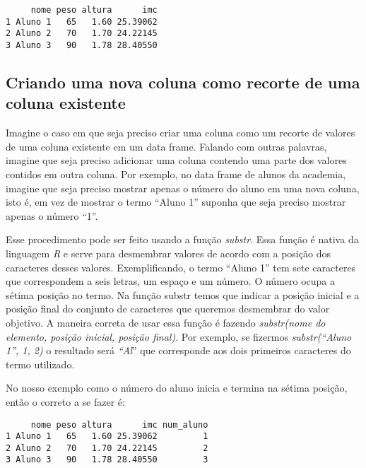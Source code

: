 \documentclass[
  letterpaper,
  DIV=11,
  numbers=noendperiod]{scrreprt}
\newenvironment{Shaded}{\begin{snugshade}}{\end{snugshade}}
\newcommand{\DecValTok}[1]{\textcolor[rgb]{0.68,0.00,0.00}{#1}}
\newcommand{\FunctionTok}[1]{\textcolor[rgb]{0.28,0.35,0.67}{#1}}
\newcommand{\NormalTok}[1]{\textcolor[rgb]{0.00,0.23,0.31}{#1}}
\newcommand{\OtherTok}[1]{\textcolor[rgb]{0.00,0.23,0.31}{#1}}
\newcommand{\SpecialCharTok}[1]{\textcolor[rgb]{0.37,0.37,0.37}{#1}}
\begin{document}
\begin{verbatim}
     nome peso altura      imc
1 Aluno 1   65   1.60 25.39062
2 Aluno 2   70   1.70 24.22145
3 Aluno 3   90   1.78 28.40550
\end{verbatim}

\subsection{Criando uma nova coluna como recorte de uma coluna
existente}\label{criando-uma-nova-coluna-como-recorte-de-uma-coluna-existente}

Imagine o caso em que seja preciso criar uma coluna como um recorte de
valores de uma coluna existente em um data frame. Falando com outras
palavras, imagine que seja preciso adicionar uma coluna contendo uma
parte dos valores contidos em outra coluna. Por exemplo, no data frame
de alunos da academia, imagine que seja preciso mostrar apenas o número
do aluno em uma nova coluna, isto é, em vez de mostrar o termo ``Aluno
1'' suponha que seja preciso mostrar apenas o número ``1''.

Esse procedimento pode ser feito usando a função \emph{substr}. Essa
função é nativa da linguagem \emph{R} e serve para desmembrar valores de
acordo com a posição dos caracteres desses valores. Exemplificando, o
termo ``Aluno 1'' tem sete caracteres que correspondem a seis letras, um
espaço e um número. O número ocupa a sétima posição no termo. Na função
substr temos que indicar a posição inicial e a posição final do conjunto
de caracteres que queremos desmembrar do valor objetivo. A maneira
correta de usar essa função é fazendo \emph{substr(nome do elemento,
posição inicial, posição final)}. Por exemplo, se fizermos
\emph{substr(``Aluno 1'', 1, 2)} o resultado será \emph{``Al}'' que
corresponde aos dois primeiros caracteres do termo utilizado.

No nosso exemplo como o número do aluno inicia e termina na sétima
posição, então o correto a se fazer é:

\begin{Shaded}
\end{Shaded}

\begin{verbatim}
     nome peso altura      imc num_aluno
1 Aluno 1   65   1.60 25.39062         1
2 Aluno 2   70   1.70 24.22145         2
3 Aluno 3   90   1.78 28.40550         3
\end{verbatim}
\end{document}
